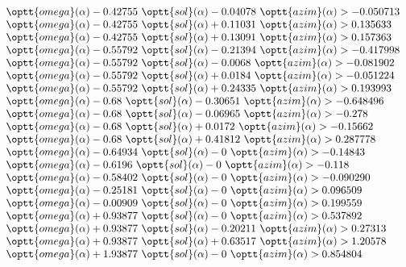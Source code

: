 $$\begin{array}{lll}
   \optt{omega}(\alpha) - 0.42755\ \optt{sol}(\alpha) - 0.04078\ \optt{azim}(\alpha) > -0.050713\\
   \optt{omega}(\alpha) - 0.42755\ \optt{sol}(\alpha) + 0.11031\ \optt{azim}(\alpha) > 0.135633\\
   \optt{omega}(\alpha) - 0.42755\ \optt{sol}(\alpha) + 0.13091\ \optt{azim}(\alpha) > 0.157363\\
   \optt{omega}(\alpha) - 0.55792\ \optt{sol}(\alpha) - 0.21394\ \optt{azim}(\alpha) > -0.417998\\
   \optt{omega}(\alpha) - 0.55792\ \optt{sol}(\alpha) - 0.0068\ \optt{azim}(\alpha) > -0.081902\\
   \optt{omega}(\alpha) - 0.55792\ \optt{sol}(\alpha) + 0.0184\ \optt{azim}(\alpha) > -0.051224\\
   \optt{omega}(\alpha) - 0.55792\ \optt{sol}(\alpha) + 0.24335\ \optt{azim}(\alpha) > 0.193993\\
   \optt{omega}(\alpha) - 0.68\ \optt{sol}(\alpha) - 0.30651\ \optt{azim}(\alpha) > -0.648496\\
   \optt{omega}(\alpha) - 0.68\ \optt{sol}(\alpha) - 0.06965\ \optt{azim}(\alpha) > -0.278\\
   \optt{omega}(\alpha) - 0.68\ \optt{sol}(\alpha) + 0.0172\ \optt{azim}(\alpha) > -0.15662\\
   \optt{omega}(\alpha) - 0.68\ \optt{sol}(\alpha) + 0.41812\ \optt{azim}(\alpha) > 0.287778\\
   \optt{omega}(\alpha) - 0.64934\ \optt{sol}(\alpha) - 0\ \optt{azim}(\alpha) > -0.14843\\
   \optt{omega}(\alpha) - 0.6196\ \optt{sol}(\alpha) - 0\ \optt{azim}(\alpha) > -0.118\\
   \optt{omega}(\alpha) - 0.58402\ \optt{sol}(\alpha) - 0\ \optt{azim}(\alpha) > -0.090290\\
   \optt{omega}(\alpha) - 0.25181\ \optt{sol}(\alpha) - 0\ \optt{azim}(\alpha) > 0.096509\\
   \optt{omega}(\alpha) - 0.00909\ \optt{sol}(\alpha) - 0\ \optt{azim}(\alpha) > 0.199559\\
   \optt{omega}(\alpha) + 0.93877\ \optt{sol}(\alpha) - 0\ \optt{azim}(\alpha) > 0.537892\\
   \optt{omega}(\alpha) + 0.93877\ \optt{sol}(\alpha) - 0.20211\ \optt{azim}(\alpha) > 0.27313\\
   \optt{omega}(\alpha) + 0.93877\ \optt{sol}(\alpha) + 0.63517\ \optt{azim}(\alpha) > 1.20578\\
   \optt{omega}(\alpha) + 1.93877\ \optt{sol}(\alpha) - 0\ \optt{azim}(\alpha) > 0.854804\\

\end{array}$$

